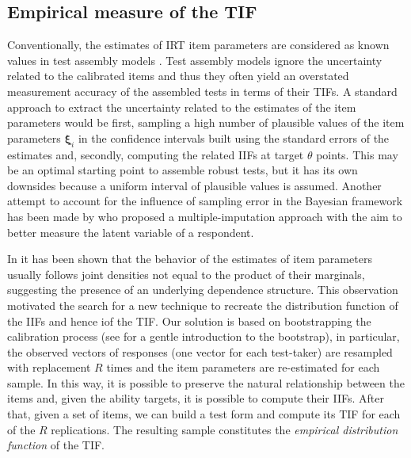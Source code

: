 \subsection{Empirical measure of the TIF}\label{sec:edfTIF}

Conventionally, the estimates of IRT item parameters are considered as known values in test assembly models \parencite{VDL2005}. Test assembly models ignore the uncertainty related to the calibrated items and thus they often yield an overstated measurement accuracy of the assembled tests in terms of their TIFs.
A standard approach to extract the uncertainty related to the estimates of the item parameters would be first, sampling a high number of plausible values of the item parameters $\boldsymbol{\xi}_i$ in the confidence intervals built using the standard errors of the estimates and, secondly, computing the related IIFs at target $\theta$ points. This may be an optimal starting point to assemble robust tests, \parencite[see]{veldkamp2013uncertainties, veldkamp2013application} but it has its own downsides because a uniform interval of plausible values is assumed. Another attempt to account for the influence of sampling error in the Bayesian framework has been made by \textcite{Yang2012} who proposed a multiple-imputation approach with the aim to better measure the latent variable of a respondent. 

In \textcite{matteucci2012prior} it has been shown that the behavior of the estimates of item parameters usually follows joint densities not equal to the product of their marginals, suggesting the presence of an underlying dependence structure. This observation motivated the search for a new technique to recreate the distribution function of the IIFs and hence iof the TIF. Our solution is based on bootstrapping the calibration process (see \textcite{efron1993} for a gentle introduction to the bootstrap), in particular, the observed vectors of responses (one vector for each test-taker) are resampled with replacement $R$ times and the item parameters are re-estimated for each sample. In this way, it is possible to preserve the natural relationship between the items and, given the ability targets, it is possible to compute their IIFs. After that, given a set of items, we can build a test form and compute its TIF for each of the $R$ replications. The resulting sample constitutes the \emph{empirical distribution function} of the TIF. 

